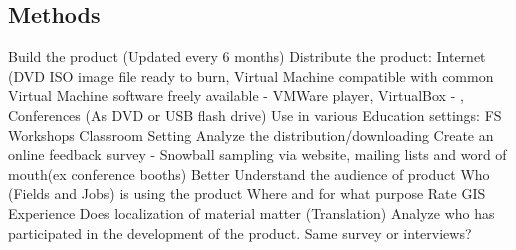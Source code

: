 \documentclass[12pt,letterpaper]{article}
\begin{document}
%


\subsection{Methods}
Build the product (Updated every 6 months)
Distribute the product: Internet (DVD ISO image file ready to burn, Virtual Machine compatible with common Virtual Machine software freely available - VMWare player, VirtualBox - , Conferences (As DVD or USB flash drive)
Use in various Education settings:
	FS Workshops
	Classroom Setting
Analyze the distribution/downloading 
Create an online feedback survey - Snowball sampling via website, mailing lists and word of mouth(ex conference booths)
	Better Understand the audience of product
	Who (Fields and Jobs) is using the product Where and for what purpose
	Rate GIS Experience
	Does localization of material matter (Translation)	
Analyze who has participated in the development of the product. Same survey or interviews?	
	
\end{document}

